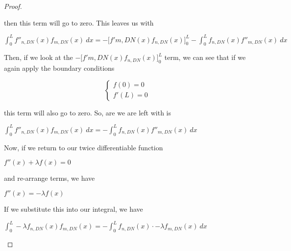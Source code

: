 \documentclass[executivepaper]{article}
\begin{document}
\begin{flushleft}
\begin{proof}
\begin{center}
\end{center}

then this term will go to zero. This leaves us with

\begin{center}

$\int_{0}^{L} f''_{n, DN}(x)f_{m, DN}(x) \ dx=- \bigg[f'{m, DN}(x)f_{n, DN}(x)\bigg]_{0}^{L} - \int_{0}^{L} f_{n, DN}(x)f''_{m, DN}(x) \ dx$

\end{center}

Then, if we look at the $- \bigg[f'{m, DN}(x)f_{n, DN}(x)\bigg]_{0}^{L}$ term, we can see that if we again apply the boundary conditions

\begin{center}

\[ \begin{cases} 
      f(0)=0 \\
      f'(L)=0
   \end{cases}
\]

\end{center}

this term will also go to zero. So, are we are left with is

\begin{center}

$\int_{0}^{L} f''_{n, DN}(x)f_{m, DN}(x) \ dx=- \int_{0}^{L} f_{n, DN}(x)f''_{m, DN}(x) \ dx$

\end{center}

Now, if we return to our twice differentiable function

\begin{center}

$f''(x)+\lambda f(x)=0$

\end{center}

and re-arrange terms, we have

\begin{center}

$f''(x)=-\lambda f(x)$

\end{center}

If we substitute this into our integral, we have

\begin{center}

$\int_{0}^{L} -\lambda f_{n, DN}(x)f_{m, DN}(x)=-\int_{0}^{L} f_{n, DN}(x) \cdot -\lambda f_{m, DN}(x) \ dx$

\end{center}


\end{proof}
\end{flushleft}
\end{document}
